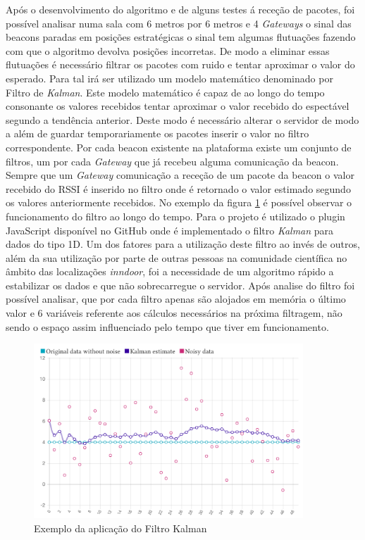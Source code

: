 \par Após o desenvolvimento do algoritmo e de alguns testes á receção de pacotes, foi possível analisar numa sala com 6 metros por 6 metros e 4 \textit{Gateways} o sinal das beacons paradas em posições estratégicas o sinal tem algumas flutuações fazendo com que o algoritmo devolva posições incorretas. De modo a eliminar essas flutuações é necessário filtrar os pacotes com ruido e tentar aproximar o valor do esperado. Para tal irá ser utilizado um modelo matemático denominado por Filtro de \textit{Kalman}. Este modelo matemático é capaz de ao longo do tempo consonante os valores recebidos tentar aproximar o valor recebido do espectável segundo a tendência anterior. Deste modo é necessário alterar o servidor de modo a além de guardar temporariamente os pacotes inserir o valor no filtro correspondente. Por cada beacon existente na plataforma existe um conjunto de filtros, um por cada \textit{Gateway} que já recebeu alguma comunicação da beacon. Sempre que um \textit{Gateway} comunicação a receção de um pacote da beacon o valor recebido do RSSI é inserido no filtro onde é retornado o valor estimado segundo os valores anteriormente recebidos. No exemplo da figura \ref{kalman1} é possível observar o funcionamento do filtro ao longo do tempo. Para o projeto é utilizado o plugin JavaScript disponível no GitHub onde é implementado o filtro \textit{Kalman} para dados do tipo 1D. Um dos fatores para a utilização deste filtro ao invés de outros, além da sua utilização por parte de outras pessoas na comunidade científica no âmbito das localizações \textit{inndoor}, foi a necessidade de um algoritmo rápido a estabilizar os dados e que não sobrecarregue o servidor. Após analise do filtro foi possível analisar, que por cada filtro apenas são alojados em memória o último valor e 6 variáveis referente aos cálculos necessários na próxima filtragem, não sendo o espaço assim influenciado pelo tempo que tiver em funcionamento.

\begin{figure}[ht]
\centering
\includegraphics[width=0.90\textwidth]{images/kalman-example.png}
\caption{Exemplo da aplicação do Filtro Kalman \cite{kalman}}\label{kalman1}
\end{figure}



